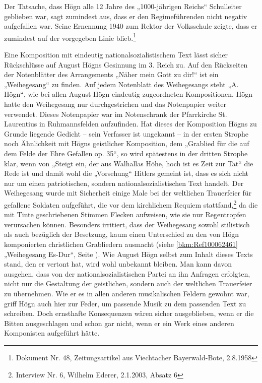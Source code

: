 \documentclass[a4paper]{article}
\begin{document}
Der Tatsache, dass Högn alle 12 Jahre des „1000-jährigen Reichs“
Schulleiter geblieben war, sagt zumindest aus, dass er den
Regimeführenden nicht negativ aufgefallen war. Seine Ernennung 1940 zum
Rektor der Volksschule zeigte, dass er zumindest auf der vorgegeben
Linie blieb.\footnote{ Dokument Nr. 48, Zeitungsartikel aus Viechtacher
Bayerwald-Bote, 2.8.1958}

Eine Komposition mit eindeutig nationalsozialistischem Text lässt sicher
Rückschlüsse auf August Högns Gesinnung im 3. Reich zu. Auf den
Rückseiten der Notenblätter des Arrangements „Näher mein Gott zu dir!“
ist ein „Weihegesang“ zu finden. Auf jedem Notenblatt des Weihegesangs
steht „A. Högn“, wie bei allen August Högn eindeutig zugeordneten
Kompositionen. Högn hatte den Weihegesang nur durchgestrichen und das
Notenpapier weiter verwendet. Dieses Notenpapier war im Notenschrank
der Pfarrkirche St. Laurentius in Ruhmannsfelden aufzufinden. Hat
dieses der Komposition Högns zu Grunde liegende Gedicht – sein
Verfasser ist ungekannt – in der ersten Strophe noch Ähnlichkeit mit
Högns geistlicher Komposition, dem „Grablied für die auf dem Felde der
Ehre Gefallen op. 35“, so wird spätestens in der dritten Strophe klar,
wenn von „Steigt ein, der aus Walhallas Höhe, hoch ist es Zeit zur Tat“
die Rede ist und damit wohl die „Vorsehung“ Hitlers gemeint ist, dass
es sich nicht nur um einen patriotischen, sondern
nationalsozialistischen Text handelt. Der Weihegesang wurde mit
Sicherheit einige Male bei der weltlichen Trauerfeier für gefallene
Soldaten aufgeführt, die vor dem kirchlichem Requiem
stattfand,\footnote{ Interview Nr. 6, Wilhelm Ederer, 2.1.2003, Absatz
6} da die mit Tinte geschriebenen Stimmen Flecken aufweisen, wie sie
nur Regentropfen verursachen können. Besonders irritiert, dass der
Weihegesang sowohl stilistisch als auch bezüglich der Besetzung, kaum
einen Unterschied zu den von Högn komponierten christlichen Grabliedern
ausmacht (siehe \ref{bkm:Ref100062461} „Weihegesang Es-Dur“, Seite
\pageref{bkm:Ref100062456}). Wie August Högn selbst zum Inhalt dieses
Texts stand, den er vertont hat, wird wohl unbekannt bleiben. Man kann
davon ausgehen, dass von der nationalsozialistischen Partei an ihn
Anfragen erfolgten, nicht nur die Gestaltung der geistlichen, sondern
auch der weltlichen Trauerfeier zu übernehmen. Wie er es in allen
anderen musikalischen Feldern gewohnt war, griff Högn auch hier zur
Feder, um passende Musik zu dem passenden Text zu schreiben. Doch
ernsthafte Konsequenzen wären sicher ausgeblieben, wenn er die Bitten
ausgeschlagen und schon gar nicht, wenn er ein Werk eines anderen
Komponisten aufgeführt hätte. 
\end{document}
